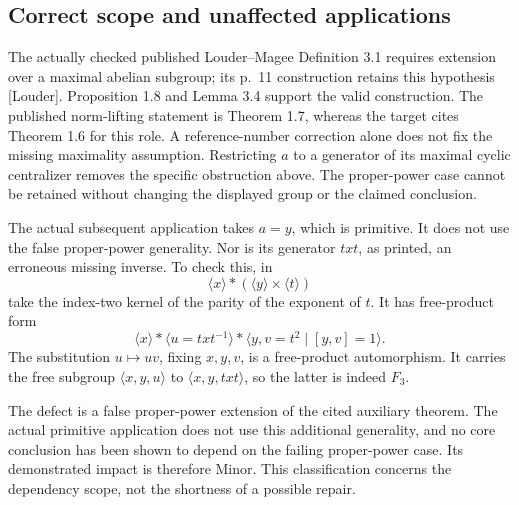 \documentclass[10pt]{article}
\begin{document}
\subsection*{Correct scope and unaffected applications}
The actually checked published Louder–Magee Definition 3.1 requires extension over a maximal abelian subgroup; its p. 11 construction retains this hypothesis [Louder]. Proposition 1.8 and Lemma 3.4 support the valid construction. The published norm-lifting statement is Theorem 1.7, whereas the target cites Theorem 1.6 for this role. A reference-number correction alone does not fix the missing maximality assumption. Restricting \(a\) to a generator of its maximal cyclic centralizer removes the specific obstruction above. The proper-power case cannot be retained without changing the displayed group or the claimed conclusion.\par
The actual subsequent application takes \(a=y\), which is primitive. It does not use the false proper-power generality. Nor is its generator \(txt\), as printed, an erroneous missing inverse. To check this, in \[\langle x\rangle*(\langle y\rangle\times\langle t\rangle)\] take the index-two kernel of the parity of the exponent of \(t\). It has free-product form \[\langle x\rangle*\langle u=txt^{-1}\rangle*
          \langle y,v=t^2\mid[y,v]=1\rangle .\] The substitution \(u\mapsto uv\), fixing \(x,y,v\), is a free-product automorphism. It carries the free subgroup \(\langle x,y,u\rangle\) to \(\langle x,y,txt\rangle\), so the latter is indeed \(F_3\).\par
The defect is a false proper-power extension of the cited auxiliary theorem. The actual primitive application does not use this additional generality, and no core conclusion has been shown to depend on the failing proper-power case. Its demonstrated impact is therefore Minor. This classification concerns the dependency scope, not the shortness of a possible repair.\par
\end{document}

